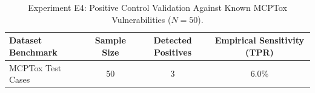 \begin{table}[h]
\centering
\caption{Experiment E4: Positive Control Validation Against Known MCPTox Vulnerabilities ($N=50$).}
\label{tab:e4_mcptox}
\small
\begin{tabular}{lccc}
\hline
\textbf{Dataset Benchmark} & \textbf{Sample Size} & \textbf{Detected Positives} & \textbf{Empirical Sensitivity (TPR)} \\
\hline
MCPTox Test Cases & 50 & 3 & 6.0\% \\
\hline
\end{tabular}
\end{table}
